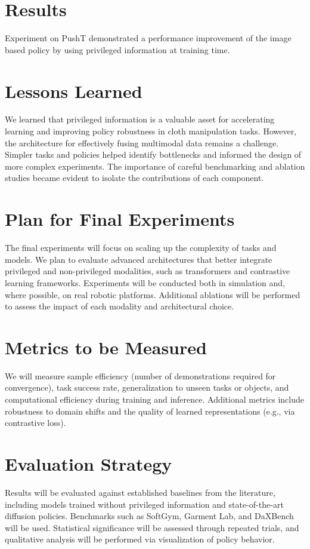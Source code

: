 \documentclass{article}
\begin{document}
\section{Results}
Experiment on PushT demonstrated a performance improvement of the image based policy by using privileged information at training time. 



\section{Lessons Learned}
We learned that privileged information is a valuable asset for accelerating learning and improving policy robustness in cloth manipulation tasks. However, the architecture for effectively fusing multimodal data remains a challenge. Simpler tasks and policies helped identify bottlenecks and informed the design of more complex experiments. The importance of careful benchmarking and ablation studies became evident to isolate the contributions of each component.

\section{Plan for Final Experiments}
The final experiments will focus on scaling up the complexity of tasks and models. We plan to evaluate advanced architectures that better integrate privileged and non-privileged modalities, such as transformers and contrastive learning frameworks. Experiments will be conducted both in simulation and, where possible, on real robotic platforms. Additional ablations will be performed to assess the impact of each modality and architectural choice.

\section{Metrics to be Measured}
We will measure sample efficiency (number of demonstrations required for convergence), task success rate, generalization to unseen tasks or objects, and computational efficiency during training and inference. Additional metrics include robustness to domain shifts and the quality of learned representations (e.g., via contrastive loss).

\section{Evaluation Strategy}
Results will be evaluated against established baselines from the literature, including models trained without privileged information and state-of-the-art diffusion policies. Benchmarks such as SoftGym, Garment Lab, and DaXBench will be used. Statistical significance will be assessed through repeated trials, and qualitative analysis will be performed via visualization of policy behavior.
\end{document}
